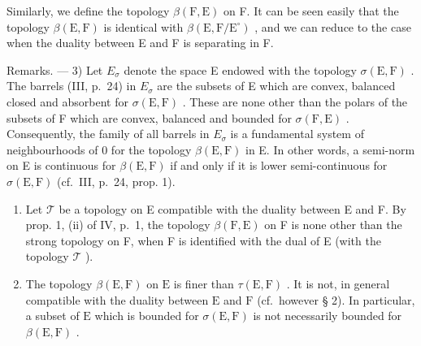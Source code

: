Similarly, we define the topology \(\beta(\mathrm{F},\mathrm{E})\) on F. It can be seen easily that the topology \(\beta(\mathrm{E},\mathrm{F})\) is identical with \(\beta(\mathrm{E},\mathrm{F}/\mathrm{E}^{\circ})\) , and we can reduce to the case when the duality between E and F is separating in F.

Remarks. --- 3) Let \(E_{\sigma}\) denote the space E endowed with the topology \(\sigma(\mathrm{E}, \mathrm{F})\) . The barrels (III, p.~24) in \(E_{\sigma}\) are the subsets of E which are convex, balanced closed and absorbent for \(\sigma(\mathrm{E}, \mathrm{F})\) . These are none other than the polars of the subsets of F which are convex, balanced and bounded for \(\sigma(\mathrm{F}, \mathrm{E})\) . Consequently, the family of all barrels in \(E_{\sigma}\) is a fundamental system of neighbourhoods of 0 for the topology \(\beta(\mathrm{E}, \mathrm{F})\) in E. In other words, a semi-norm on E is continuous for \(\beta(\mathrm{E}, \mathrm{F})\) if and only if it is lower semi-continuous for \(\sigma(\mathrm{E}, \mathrm{F})\) (cf.~III, p.~24, prop. 1).

\begin{enumerate}
\def\labelenumi{\arabic{enumi})}
\setcounter{enumi}{3}
\item
  Let \(\mathcal{T}\) be a topology on E compatible with the duality between E and F. By prop. 1, (ii) of IV, p.~1, the topology \(\beta(\mathrm{F},\mathrm{E})\) on F is none other than the strong topology on F, when F is identified with the dual of E (with the topology \(\mathcal{T}\) ).
\item
  The topology \(\beta(\mathrm{E},\mathrm{F})\) on \(\mathrm{E}\) is finer than \(\tau(\mathrm{E},\mathrm{F})\) . It is not, in general compatible with the duality between \(\mathrm{E}\) and \(\mathrm{F}\) (cf.~however § 2). In particular, a subset of \(\mathrm{E}\) which is bounded for \(\sigma(\mathrm{E},\mathrm{F})\) is not necessarily bounded for \(\beta(\mathrm{E},\mathrm{F})\) .
\end{enumerate}
\relax{}
